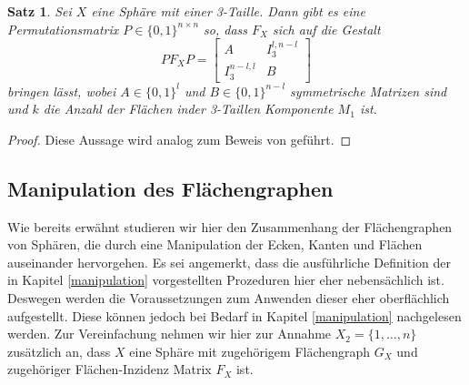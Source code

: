 \documentclass[12pt,titlepage,twoside,cleardoublepage]{article}
\theoremstyle{nummermitklammern}
\newtheorem{satz}[temp]{Satz}
\newtheorem{satz}[zahl]{Satz}
\numberwithin{equation}{section}
\begin{document}
\begin{satz}
Sei $X$ eine Sphäre mit einer 3-Taille. Dann gibt es eine Permutationsmatrix $P\in \{0,1\}^{n \times n}$ so, dass $F_X$ sich auf die Gestalt 
\[
PF_XP=
\left[ 
\begin{array}{c|c} 
  A & I^{l,n-l}_3 \\ 
  \hline 
  I^{n-l,l}_3 & B 
\end{array} 
\right]
\] 
bringen lässt, wobei $A\in \{0,1\}^{l}$ und $B\in \{0,1\}^{n-l}$ symmetrische Matrizen sind und $k$ die Anzahl der Flächen inder 3-Taillen Komponente $M_1$ ist.
\end{satz}
\begin{proof}
Diese Aussage wird analog zum Beweis von  geführt.
\end{proof}

\subsection{Manipulation des Flächengraphen }
Wie bereits erwähnt studieren wir hier den Zusammenhang der Flächengraphen von Sphären, die durch eine Manipulation der Ecken, Kanten und Flächen auseinander hervorgehen. Es sei angemerkt, dass die ausführliche Definition der in Kapitel \ref{manipulation} vorgestellten Prozeduren hier eher nebensächlich ist. Deswegen werden die Voraussetzungen zum Anwenden dieser eher oberflächlich aufgestellt. Diese können jedoch bei Bedarf in Kapitel \ref{manipulation} nachgelesen werden. Zur Vereinfachung nehmen wir hier zur Annahme $X_2  =\{1,\ldots,n\}$ zusätzlich an, dass $X$ eine Sphäre mit zugehörigem Flächengraph $G_X$ und zugehöriger Flächen-Inzidenz Matrix $F_X$ ist.
\end{document}

